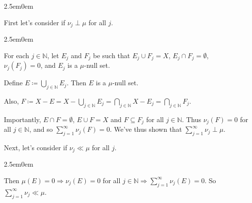\documentclass{book}
\newcommand{\exTwoP}{%
   \color{RedViolet}%
   \fontsize{13}{15}\selectfont%
}
\newcommand{\exPP}{%
   \color{RedViolet}%
   \fontsize{12}{14}\selectfont%
}
\newenvironment{myIndent}{%
   \begin{adjustwidth}{2.5em}{0em}%
}{%
   \end{adjustwidth}%
}
\newcommand{\retTwo}{\hfill\bigbreak}
\begin{document}
\begin{myIndent}\exTwoP
	First let's consider if $\nu_j \perp \mu$ for all $j$.
	
	\begin{myIndent}\exPP
		For each $j \in \mathbb{N}$, let $E_j$ and $F_j$ be such that $E_j \cup F_j = X$,\phantom{a} $E_j \cap F_j = \emptyset$,\\ $\nu_j(F_j) = 0$, and $E_j$ is a $\mu$-null set.\retTwo
	
		Define $E \coloneq \bigcup\limits_{j \in \mathbb{N}} E_j$. Then $E$ is a $\mu$-null set.\retTwo
	
		Also, $F \coloneq X - E = X - \bigcup\limits_{j \in \mathbb{N}} E_j = \bigcap\limits_{j \in \mathbb{N}}X - E_j = \bigcap\limits_{j \in \mathbb{N}} F_j$.\retTwo
	
		Importantly, $E \cap F = \emptyset$, $E \cup F = X$ and $F \subseteq F_j$ for all $j \in \mathbb{N}$. Thus $\nu_j(F) = 0$ for all $j \in \mathbb{N}$, and so $\sum\limits_{j = 1}^\infty \nu_j(F) = 0$. We've thus shown that $\sum\limits_{j = 1}^\infty \nu_j \perp \mu$.\retTwo
	\end{myIndent}

	Next, let's consider if $\nu_j \ll \mu$ for all $j$.
	
	\begin{myIndent}\exPP
		Then $\mu(E) = 0 \Longrightarrow \nu_j(E) = 0$ for all $j \in \mathbb{N} \Longrightarrow \sum\limits_{j=1}^\infty \nu_j(E) = 0$. So $\sum\limits_{j=1}^\infty \nu_j \ll \mu$.\newpage
	\end{myIndent}
\end{myIndent}
\end{document}
